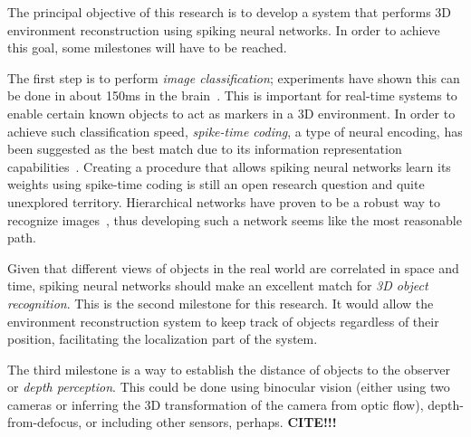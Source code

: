 The principal objective of this research is to develop a system that performs 3D environment reconstruction using spiking neural networks. In order to achieve this goal, some milestones will have to be reached. 

The first step is to perform \emph{image classification}; experiments have shown this can be done in about 150ms in the brain~\cite{Thorpe1996-speed-of-processing}. This is important for real-time systems to enable certain known objects to act as markers in a 3D environment. In order to achieve such classification speed, \emph{spike-time coding}, a type of neural encoding, has been suggested as the best match due to its information representation capabilities~\cite{VanRullen2005-spike-times}. Creating a procedure that allows spiking neural networks learn its weights using spike-time coding is still an open research question and quite unexplored territory. Hierarchical networks have proven to be a robust way to recognize images~\cite{Behnke2003-hierachical-interpretation,Bengio2009-deep-architectures}, thus developing such a network seems like the most reasonable path. 

Given that different views of objects in the real world are correlated in space and time, spiking neural networks should make an excellent match for \emph{3D object recognition}. This is the second milestone for this research. It would allow the environment reconstruction system to keep track of objects regardless of their position, facilitating the localization part of the system.

The third milestone is a way to establish the distance of objects to the observer or \emph{depth perception}. This could be done using binocular vision (either using two cameras or inferring the 3D transformation of the camera from optic flow), depth-from-defocus, or including other sensors, perhaps. \textbf{CITE!!!}

